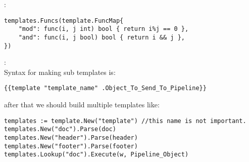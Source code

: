 \begin{note}:\\
\begin{lstlisting}[language=Golang]
templates.Funcs(template.FuncMap{
	"mod": func(i, j int) bool { return i%j == 0 },
	"and": func(i, j bool) bool { return i && j },
})
\end{lstlisting}
\end{note}
\begin{note}[Subtemplates]:\\
Syntax for making sub templates is:
\begin{lstlisting}[language=Golang]
{{template "template_name" .Object_To_Send_To_Pipeline}}
\end{lstlisting}
after that we should build multiple templates like:
\begin{lstlisting}[language=Golang]
templates := template.New("template") //this name is not important.
templates.New("doc").Parse(doc)
templates.New("header").Parse(header)
templates.New("footer").Parse(footer)
templates.Lookup("doc").Execute(w, Pipeline_Object)
\end{lstlisting}
\end{note}
